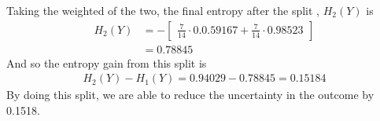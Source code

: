 \documentclass[11pt]{article}
\begin{document}
Taking the weighted of the two, the final entropy after the split , $H_2(Y)$ is
\begin{align*}
H_2(Y) &= -\begin{bmatrix}\frac 7 {14} \cdot 0.0.59167 + \frac 7{14} \cdot 0.98523\end{bmatrix}\\&= 0.78845
\end{align*}
And so the entropy gain from this split is 
\begin{align*}
H_2(Y) - H_1(Y) = 0.94029-0.78845 = 0.15184
\end{align*}
By doing this split, we are able to reduce the uncertainty in the outcome by 0.1518.
\end{document}
